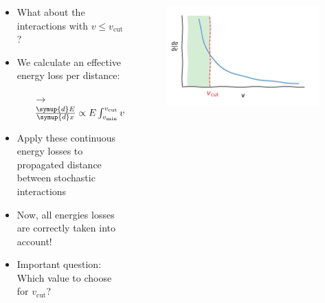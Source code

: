 \documentclass[aspectratio=1610, 9pt]{beamer}
\begin{document}
\begin{frame}[c]
    \begin{columns}[onlytextwidth]

      \begin{column}{0.5\textwidth}
        \begin{itemize}
            \item What about the interactions with $v \leq v_\text{cut}$?
            \item We calculate an effective energy loss per distance:
            \begin{itemize}
              \item[$\rightarrow$] $\frac{\symup{d}E}{\symup{d}x} \propto E \int_{v_\text{min}}^{v_\text{cut}} v \frac{\symup{d}\sigma}{\symup{d}v} \, \symup{d}v$
            \end{itemize}
            \item Apply these continuous energy losses to propagated distance between stochastic interactions
            \item Now, all energies losses are correctly taken into account! 
            \item Important question: Which value to choose for $v_\text{cut}$?
        \end{itemize}


      \end{column}

    \begin{column}{0.5\textwidth}
      \begin{figure}
        \includegraphics[width=\textwidth]{diverging_v_cont.pdf}
      \end{figure}
    \end{column}
    \end{columns}
\end{frame}
\end{document}
